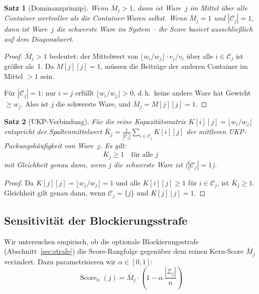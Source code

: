 \documentclass[a4paper,11pt]{article}
\newtheorem{satz}{Satz}
\begin{document}
\begin{satz}[Dominanzprinzip]
\label{satz:dom}
Wenn $\bar{M}_j > 1$, dann ist Ware~$j$ im Mittel über alle
Container wertvoller als die Container-Waren selbst.
Wenn $\bar{M}_j = 1$ und $|\mathcal{C}_j| = 1$, dann ist Ware~$j$
die schwerste Ware im System -- ihr Score basiert
ausschließlich auf dem Diagonalwert.
\end{satz}

\begin{proof}
$\bar{M}_j > 1$ bedeutet: der Mittelwert von
$\lfloor w_i/w_j \rfloor \cdot v_j/v_i$ über alle $i \in \mathcal{C}_j$
ist größer als~1. Da $M[j][j] = 1$, müssen die Beiträge
der anderen Container im Mittel $> 1$ sein.

Für $|\mathcal{C}_j| = 1$: nur $i = j$ erfüllt
$\lfloor w_i/w_j \rfloor > 0$, d.\,h.\ keine andere Ware hat
Gewicht $\ge w_j$. Also ist $j$ die schwerste Ware, und
$\bar{M}_j = M[j][j] = 1$.
\end{proof}

\begin{satz}[UKP-Verbindung]
\label{satz:ukp}
Für die reine Kapazitätsmatrix $K[i][j] = \lfloor w_i/w_j \rfloor$
entspricht der Spaltenmittelwert
$\bar{K}_j = \frac{1}{|\mathcal{C}_j|}\sum_{i \in \mathcal{C}_j}
K[i][j]$
der mittleren UKP-Packungshäufigkeit von Ware~$j$.
Es gilt:
\[
\bar{K}_j \ge 1 \quad \text{für alle } j
\]
mit Gleichheit genau dann, wenn $j$ die schwerste Ware ist
($|\mathcal{C}_j| = 1$).
\end{satz}

\begin{proof}
Da $K[j][j] = \lfloor w_j/w_j \rfloor = 1$ und alle
$K[i][j] \ge 1$ für $i \in \mathcal{C}_j$, ist
$\bar{K}_j \ge 1$.
Gleichheit gilt genau dann, wenn $\mathcal{C}_j = \{j\}$
und $K[j][j] = 1$.
\end{proof}

\subsection{Sensitivität der Blockierungsstrafe}
\label{sec:alpha}

Wir untersuchen empirisch, ob die optionale Blockierungsstrafe
(Abschnitt~\ref{sec:strafe}) die Score-Rangfolge gegenüber
dem reinen Kern-Score $\bar{M}_j$ verändert.
Dazu parametrisieren wir $\alpha \in [0,1]$:
\[
\operatorname{Score}_\alpha(j)
= \bar{M}_j \cdot \left(1 - \alpha\,\frac{|\mathcal{Z}_j|}{n}\right)
\]
\end{document}
